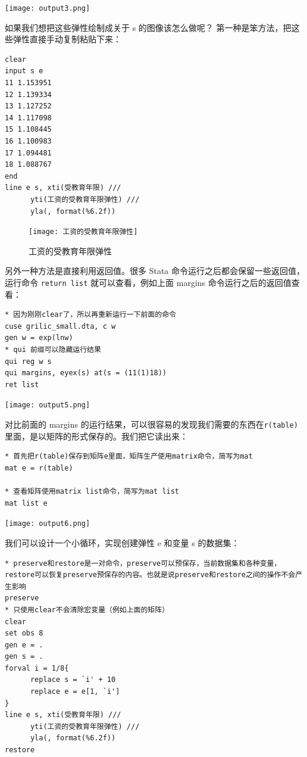 \documentclass[cn,fancy,blue,11pt]{elegantbook}
\begin{document}
\noindent\texttt{[image: output3.png]}

如果我们想把这些弹性绘制成关于 s 的图像该怎么做呢？
第一种是笨方法，把这些弹性直接手动复制粘贴下来：

\begin{lstlisting}
clear
input s e
11 1.153951
12 1.139334
13 1.127252
14 1.117098
15 1.108445
16 1.100983
17 1.094481
18 1.088767
end
line e s, xti(受教育年限) ///
      yti(工资的受教育年限弹性) ///
      yla(, format(%6.2f))
\end{lstlisting}

\begin{figure}
  \centering \texttt{[image: 工资的受教育年限弹性]}
  \caption{工资的受教育年限弹性}
  \label{fig:wage123}
\end{figure}

另外一种方法是直接利用返回值。很多 Stata 命令运行之后都会保留一些返回值，运行命令 \lstinline{return list} 就可以查看，例如上面 margins 命令运行之后的返回值查看：

\begin{lstlisting}
* 因为刚刚clear了，所以再重新运行一下前面的命令
cuse grilic_small.dta, c w
gen w = exp(lnw)
* qui 前缀可以隐藏运行结果
qui reg w s
qui margins, eyex(s) at(s = (11(1)18))
ret list
\end{lstlisting}

\noindent\texttt{[image: output5.png]}

对比前面的 margins 的运行结果，可以很容易的发现我们需要的东西在\lstinline{r(table)}里面，是以矩阵的形式保存的。我们把它读出来：

\begin{lstlisting}
* 首先把r(table)保存到矩阵e里面，矩阵生产使用matrix命令，简写为mat
mat e = r(table)

* 查看矩阵使用matrix list命令，简写为mat list
mat list e
\end{lstlisting}

\noindent\texttt{[image: output6.png]}

我们可以设计一个小循环，实现创建弹性 e 和变量 s 的数据集：

\begin{lstlisting}
* preserve和restore是一对命令，preserve可以预保存，当前数据集和各种变量，restore可以恢复preserve预保存的内容。也就是说preserve和restore之间的操作不会产生影响
preserve
* 只使用clear不会清除宏变量（例如上面的矩阵）
clear
set obs 8
gen e = .
gen s = .
forval i = 1/8{
      replace s = `i' + 10
      replace e = e[1, `i']
}
line e s, xti(受教育年限) ///
      yti(工资的受教育年限弹性) ///
      yla(, format(%6.2f))
restore
\end{lstlisting}
\end{document}
